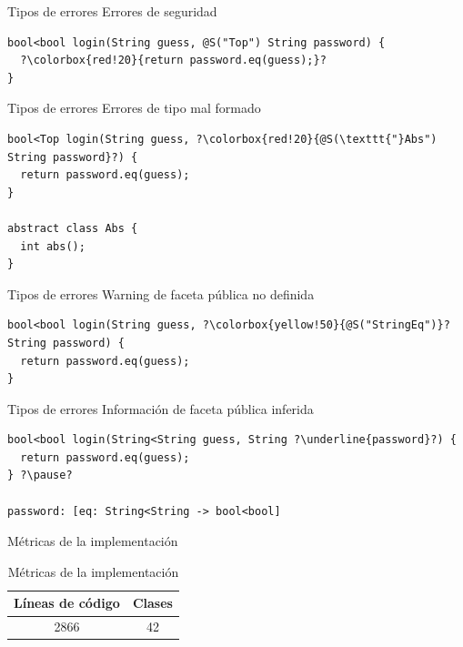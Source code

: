 \documentclass[aspectratio=169,18pt]{beamer}
\begin{document}
\begin{frame}[fragile]{Tipos de errores}
	Errores de seguridad \\ \pause
	\vspace{1cm}
\begin{lstlisting}[escapechar=?,basicstyle=\fontsize{10}{10}\ttfamily]
bool<bool login(String guess, @S("Top") String password) {
  ?\colorbox{red!20}{return password.eq(guess);}?
}
\end{lstlisting}
\end{frame}

\begin{frame}[fragile]{Tipos de errores}
	Errores de tipo mal formado \\ \pause
	\vspace{1cm}
\begin{lstlisting}[escapechar=?,basicstyle=\fontsize{10}{10}\ttfamily]
bool<Top login(String guess, ?\colorbox{red!20}{@S(\texttt{"}Abs") String password}?) {
  return password.eq(guess);
}

abstract class Abs {
  int abs();
}
\end{lstlisting}
\end{frame}

\begin{frame}[fragile]{Tipos de errores}
	Warning de faceta pública no definida \\ \pause
	\vspace{1cm}
\begin{lstlisting}[escapechar=?,basicstyle=\fontsize{10}{10}\ttfamily]
bool<bool login(String guess, ?\colorbox{yellow!50}{@S("StringEq")}? String password) {
  return password.eq(guess);
}
\end{lstlisting}
\end{frame}

\begin{frame}[fragile]{Tipos de errores}
	Información de faceta pública inferida \\ \pause
	\vspace{1cm}
\begin{lstlisting}[escapechar=?,basicstyle=\fontsize{10}{10}\ttfamily]
bool<bool login(String<String guess, String ?\underline{password}?) {
  return password.eq(guess);
} ?\pause?

password: [eq: String<String -> bool<bool]
\end{lstlisting}
\end{frame}

\begin{frame}[fragile]{Métricas de la implementación}
	\begin{table}
		\caption{Métricas de la implementación}
		\begin{tabular}{c|c}
      Líneas de código & Clases\\
      \hline
      2866 & 42\\
		\end{tabular}
	\end{table}
\end{frame}
\end{document}
